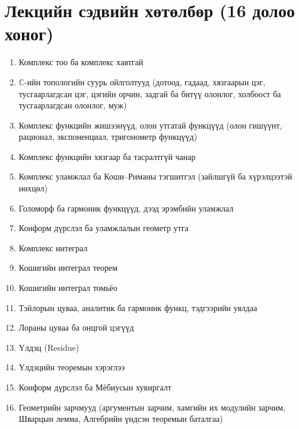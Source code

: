 \newpage
\section*{Лекцийн сэдвийн хөтөлбөр (16 долоо хоног)}

\begin{enumerate}[label=\textbf{Хичээл \arabic*.}]

\item Комплекс тоо ба комплекс хавтгай

\item $\mathbb{C}$-ийн топологийн суурь ойлголтууд  
(дотоод, гадаад, хязгаарын цэг, тусгаарлагдсан цэг, цэгийн орчин, задгай ба битүү олонлог,  холбоост ба тусгаарлагдсан олонлог, муж)

\item Комплекс функцийн жишээнүүд, олон утгатай функцүүд  
(олон гишүүнт, рационал, экспоненциал, тригонометр функцүүд)

\item Комплекс функцийн хязгаар ба тасралтгүй чанар

\item Комплекс уламжлал ба Коши--Риманы тэгшитгэл  
(зайлшгүй ба хүрэлцээтэй нөхцөл)

\item Голоморф ба гармоник функцүүд, дээд эрэмбийн уламжлал

\item Конформ дүрслэл ба уламжлалын геометр утга

\item Комплекс интеграл

\item Кошигийн интеграл теорем  

\item Кошигийн интеграл томьёо

\item Тэйлорын цуваа, аналитик ба гармоник функц, тэдгээрийн уялдаа

\item Лораны цуваа ба онцгой цэгүүд

\item Үлдэц (Residue)

\item Үлдэцийн теоремын хэрэглээ

\item Конформ дүрслэл ба Мёбиусын хувиргалт

\item Геометрийн зарчмууд (аргументын зарчим, хамгийн их модулийн зарчим, Шварцын лемма, Алгебрийн үндсэн теоремын баталгаа)
\end{enumerate}

